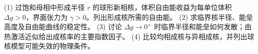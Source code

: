 (1) 过饱和母相中形成半径 \(r\) 的球形新相核，体积自由能收益为每单位体积 \(\Delta g>0\)，界面张力为 \(\gamma>0\)。列出形成核所需的自由能。
(2) 求临界核半径、能垒高度及自由能曲线的稳定性。
(3) 讨论 \(\Delta g\to0^+\) 时临界半径和能垒如何发散；由热激活近似给出成核率的主要指数因子。
(4) 比较均相成核与异相成核，并列出球核模型可能失效的物理条件。
